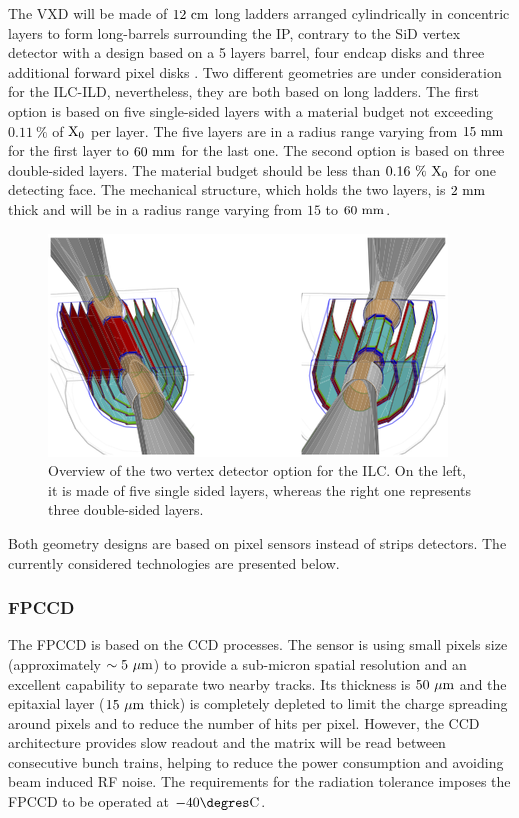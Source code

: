    The \gls{VXD} will be made of $12~\rm{cm}$ long ladders arranged cylindrically in concentric layers to form long-barrels surrounding the \gls{IP}, contrary to the \gls{SiD} vertex detector with a design based on a 5 layers barrel, four endcap disks and three additional forward pixel disks \cite{Behnke2010}.
   Two different geometries are under consideration for the \gls{ILC}-{ILD}, nevertheless, they are both based on long ladders. 
   The first option is based on five single-sided layers with a material budget not exceeding $0.11~\%$ of $\rm{X_0}$ per layer.
   The five layers are in a radius range varying from $15~\rm{mm}$ for the first layer to $60~\rm{mm}$ for the last one.
   The second option is based on three double-sided layers.
   The material budget should be less than $0.16~\%~\rm{X_0}$ for one detecting face.
   The mechanical structure, which holds the two layers, is $2~\rm{mm}$ thick and will be in a radius range varying from $15$ to $60~\rm{mm}$.

   \begin{figure}[!h]
     \centering
     \includegraphics[width = 10 cm]{Pictures/vxd/ild_VXD.png}
     \caption{Overview of the two vertex detector option for the ILC. On the left, it is made of five single sided layers, whereas the right one represents three double-sided layers.}
   \end{figure}

   Both geometry designs are based on  pixel sensors instead of strips detectors.
   The currently considered technologies are presented below. 
    
   \subsubsection{FPCCD}
   
     The \gls{FPCCD} \cite{CalanchaParedes} is based on the \gls{CCD} processes.
     The sensor is using small pixels size (approximately $\sim 5~\rm{\mu m}$) to provide a sub-micron spatial resolution and an excellent capability to separate two nearby tracks.
     Its thickness is $50~\rm{\mu m}$ and the epitaxial layer ($15~\rm{\mu m}$ thick) is completely depleted to limit the charge spreading around pixels and to reduce the number of hits per pixel.
     However, the \gls{CCD} architecture provides slow readout and the matrix will be read between consecutive bunch trains, helping to reduce the power consumption and avoiding beam induced RF noise.
     The requirements for the radiation tolerance imposes the \gls{FPCCD} to be operated at $-40 \degres \rm{C}$.

